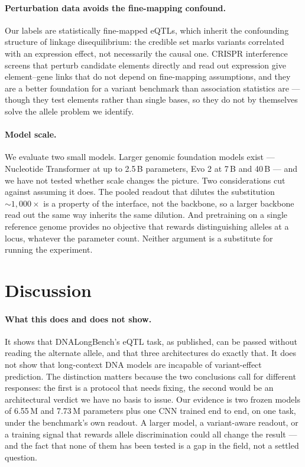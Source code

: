 \paragraph{Perturbation data avoids the fine-mapping confound.} Our labels are
statistically fine-mapped eQTLs, which inherit the confounding structure of
linkage disequilibrium: the credible set marks variants correlated with an
expression effect, not necessarily the causal one. CRISPR interference screens
that perturb candidate elements directly and read out expression
\citep{gasperini2019,schraivogel2020} give element--gene links that do not
depend on fine-mapping assumptions, and they are a better foundation for a
variant benchmark than association statistics are --- though they test elements
rather than single bases, so they do not by themselves solve the allele problem
we identify.

\paragraph{Model scale.} We evaluate two small models. Larger genomic foundation
models exist --- Nucleotide Transformer \citep{dallatorre2025nt} at up to 2.5\,B
parameters, Evo 2 \citep{brixi2026evo2} at 7\,B and 40\,B --- and we have not
tested whether scale changes the picture. Two considerations cut against
assuming it does. The pooled readout that dilutes the substitution
${\sim}1{,}000\times$ is a property of the interface, not the backbone, so a
larger backbone read out the same way inherits the same dilution. And
pretraining on a single reference genome provides no objective that rewards
distinguishing alleles at a locus, whatever the parameter count. Neither
argument is a substitute for running the experiment.
\fi

\ifdefined\RECOMB
\section{Discussion}

\paragraph{What this does and does not show.} It shows that DNALongBench's eQTL
task, as published, can be passed without reading the alternate allele, and that
three architectures do exactly that. It does not show that long-context DNA
models are incapable of variant-effect prediction. The distinction matters
because the two conclusions call for different responses: the first is a
protocol that needs fixing, the second would be an architectural verdict we have
no basis to issue. Our evidence is two frozen models of 6.55\,M and 7.73\,M
parameters plus one CNN trained end to end, on one task, under the benchmark's
own readout. A larger model, a variant-aware readout, or a training signal that
rewards allele discrimination could all change the result --- and the fact that
none of them has been tested is a gap in the field, not a settled question.


